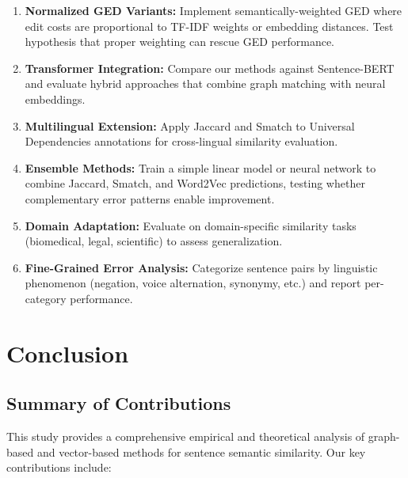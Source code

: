 \documentclass[11pt,a4paper]{article}
\begin{document}
\begin{enumerate}
    \item \textbf{Normalized GED Variants:} Implement semantically-weighted GED where edit costs are proportional to TF-IDF weights or embedding distances. Test hypothesis that proper weighting can rescue GED performance.
    
    \item \textbf{Transformer Integration:} Compare our methods against Sentence-BERT \cite{reimers2019sentence} and evaluate hybrid approaches that combine graph matching with neural embeddings.
    
    \item \textbf{Multilingual Extension:} Apply Jaccard and Smatch to Universal Dependencies \cite{de2016universal} annotations for cross-lingual similarity evaluation.
    
    \item \textbf{Ensemble Methods:} Train a simple linear model or neural network to combine Jaccard, Smatch, and Word2Vec predictions, testing whether complementary error patterns enable improvement.
    
    \item \textbf{Domain Adaptation:} Evaluate on domain-specific similarity tasks (biomedical, legal, scientific) to assess generalization.
    
    \item \textbf{Fine-Grained Error Analysis:} Categorize sentence pairs by linguistic phenomenon (negation, voice alternation, synonymy, etc.) and report per-category performance.
\end{enumerate}

\section{Conclusion}

\subsection{Summary of Contributions}

This study provides a comprehensive empirical and theoretical analysis of graph-based and vector-based methods for sentence semantic similarity. Our key contributions include:
\end{document}
